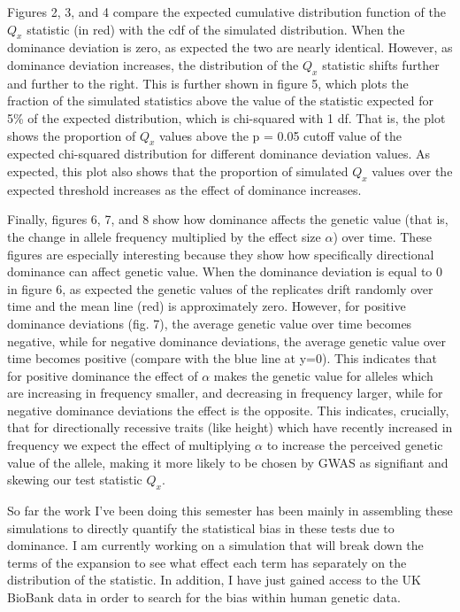 \documentclass[a4paper,10pt]{article}
\begin{document}
Figures 2, 3, and 4 compare the expected cumulative distribution
function of the $Q_x$ statistic (in red) with the cdf of the simulated
distribution. When the dominance deviation is zero, as expected the
two are nearly identical. However, as dominance deviation increases,
the distribution of the $Q_x$ statistic shifts further and further to
the right. This is further shown in figure 5, which plots the fraction
of the simulated statistics above the value of the statistic expected
for 5\% of the expected distribution, which is chi-squared with 1
df. That is, the plot shows the proportion of $Q_x$ values above the p = 0.05 cutoff value
of the expected chi-squared distribution for different dominance
deviation values. As expected, this plot also
shows that the proportion of simulated $Q_x$ values over the expected
threshold increases as the effect of dominance increases.

Finally, figures 6, 7, and 8 show how dominance affects the genetic
value (that is, the change in allele frequency multiplied by the
effect size $\alpha$) over time. These figures are especially
interesting because they show how specifically directional dominance
can affect genetic value. When the dominance deviation is equal to 0
in figure 6, as expected the genetic values of the replicates drift
randomly over time and the mean line (red) is approximately
zero. However, for positive dominance deviations (fig. 7), the average
genetic value over time becomes negative, while for negative dominance
deviations, the average genetic value over time becomes positive
(compare with the blue line at y=0). This indicates that for positive
dominance the effect of $\alpha$ makes the genetic value for alleles
which are increasing in frequency smaller, and decreasing in frequency
larger, while for negative dominance deviations the effect is the
opposite. This indicates, crucially, that for directionally recessive
traits (like height) which have recently increased in frequency we
expect the effect of multiplying $\alpha$ to increase the perceived
genetic value of the allele, making it more likely to be chosen by GWAS as signifiant and skewing our test statistic $Q_x$.   

So far the work I've been doing this semester has been mainly in
assembling these simulations to directly quantify the statistical bias
in these tests due to dominance. I am currently working on a
simulation that will break down the terms of the expansion to see what
effect each term has separately on the distribution of the
statistic. In addition, I have just gained access to the UK BioBank
data in order to search for the bias within human genetic data. 
\end{document}
